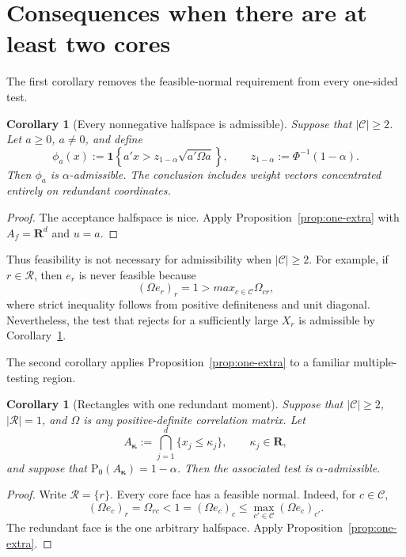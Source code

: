 \documentclass[12pt]{article}
\newtheorem{corollary}[theorem]{Corollary}
\theoremstyle{definition}
\theoremstyle{remark}
\newcommand{\Pp}{\mathrm P}
\newcommand{\R}{\mathbf R}
\newcommand{\cC}{\mathcal C}
\newcommand{\cR}{\mathcal R}
\newcommand{\1}{\mathbf 1}
\begin{document}
\section{Consequences when there are at least two cores}

The first corollary removes the feasible-normal requirement from every
one-sided test.

\begin{corollary}[Every nonnegative halfspace is admissible]
\label{cor:any-halfspace}
Suppose that $|\cC|\ge2$.  Let $a\ge0$, $a\ne0$, and define
\begin{equation}\label{eq:one-sided-test}
\phi_a(x)
:=
\1\left\{a'x>
z_{1-\alpha}\sqrt{a'\Omega a}\right\},
\qquad
z_{1-\alpha}:=\Phi^{-1}(1-\alpha).
\end{equation}
Then $\phi_a$ is $\alpha$-admissible.  The conclusion includes weight
vectors concentrated entirely on redundant coordinates.
\end{corollary}

\begin{proof}
The acceptance halfspace is nice.  Apply Proposition~\ref{prop:one-extra}
with $A_f=\R^d$ and $u=a$.
\end{proof}

Thus feasibility is not necessary for admissibility when $|\cC|\ge2$.
For example, if $r\in\cR$, then $e_r$ is never feasible because
\[
(\Omega e_r)_r=1>max_{c\in\cC}\Omega_{cr},
\]
where strict inequality follows from positive definiteness and unit
diagonal.  Nevertheless, the test that rejects for a sufficiently large
$X_r$ is admissible by Corollary~\ref{cor:any-halfspace}.

The second corollary applies Proposition~\ref{prop:one-extra} to a familiar
multiple-testing region.

\begin{corollary}[Rectangles with one redundant moment]
\label{cor:rectangles}
Suppose that $|\cC|\ge2$, $|\cR|=1$, and $\Omega$ is any
positive-definite correlation matrix.  Let
\begin{equation}\label{eq:rectangle}
A_{\bm\kappa}
:=
\bigcap_{j=1}^d\{x_j\le\kappa_j\},
\qquad \kappa_j\in\R,
\end{equation}
and suppose that $\Pp_0(A_{\bm\kappa})=1-\alpha$.  Then the associated
test is $\alpha$-admissible.
\end{corollary}

\begin{proof}
Write $\cR=\{r\}$.  Every core face has a feasible normal.  Indeed, for
$c\in\cC$,
\[
(\Omega e_c)_r=\Omega_{rc}<1=(\Omega e_c)_c
\le\max_{c'\in\cC}(\Omega e_c)_{c'}.
\]
The redundant face is the one arbitrary halfspace.  Apply
Proposition~\ref{prop:one-extra}.
\end{proof}
\end{document}

